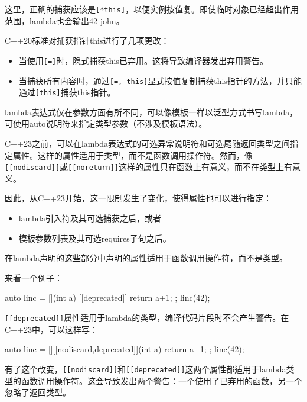 这里，正确的捕获应该是\verb|[*this]|，以便实例按值复。即使临时对象已经超出作用范围，lambda也会输出42 john。

C++20标准对捕获指针this进行了几项更改：

\begin{itemize}
\item
当使用\verb|[=]|时，隐式捕获this已弃用。这将导致编译器发出弃用警告。

\item
当捕获所有内容时，通过\verb|[=, this]|显式按值复制捕获this指针的方法，并只能通过\verb|[this]|捕获this指针。
\end{itemize}

lambda表达式仅在参数方面有所不同，可以像模板一样以泛型方式书写lambda，可使用auto说明符来指定类型参数（不涉及模板语法）。

C++23之前，可以在lambda表达式的可选异常说明符和可选尾随返回类型之间指定属性。这样的属性适用于类型，而不是函数调用操作符。然而，像\verb|[[nodiscard]]|或\verb|[[noreturn]]|这样的属性只在函数上有意义，而不在类型上有意义。

因此，从C++23开始，这一限制发生了变化，使得属性也可以进行指定：

\begin{itemize}
\item
lambda引入符及其可选捕获之后，或者

\item
模板参数列表及其可选requires子句之后。
\end{itemize}

在lambda声明的这些部分中声明的属性适用于函数调用操作符，而不是类型。

来看一个例子：

\begin{cpp}
auto linc = [](int a) [[deprecated]] { return a+1; };
linc(42);
\end{cpp}

\verb|[[deprecated]]|属性适用于lambda的类型，编译代码片段时不会产生警告。在C++23中，可以这样写：

\begin{cpp}
auto linc = [][[nodiscard,deprecated]](int a) { return a+1; };
linc(42);
\end{cpp}

有了这个改变，\verb|[[nodiscard]]|和\verb|[[deprecated]]|这两个属性都适用于lambda类型的函数调用操作符。这会导致发出两个警告：一个使用了已弃用的函数，另一个忽略了返回类型。






